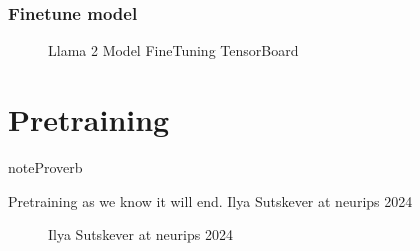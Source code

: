 \documentclass[letterpaper,11pt,english]{sphinxmanual}
\begin{document}
\subsection{Fine\sphinxhyphen{}tune model}
\label{\detokenize{finetuning:fine-tune-model}}
\begin{sphinxVerbatim}[commandchars=\\\{\}]
  


\end{sphinxVerbatim}

\begin{figure}[htbp]
\centering
\capstart

\noindent{}
\caption{Llama 2 Model Fine\sphinxhyphen{}Tuning TensorBoard}\label{\detokenize{finetuning:id7}}\label{\detokenize{finetuning:fig-fine-tuning-llm}}\end{figure}

\sphinxstepscope


\chapter{Pre\sphinxhyphen{}training}
\label{\detokenize{pretraining:pre-training}}\label{\detokenize{pretraining:pretraining}}\label{\detokenize{pretraining::doc}}
\begin{sphinxadmonition}{note}{Proverb}

\sphinxAtStartPar
Pre\sphinxhyphen{}training as we know it will end. \textendash{} Ilya Sutskever at neurips 2024

\begin{figure}[H]
\centering
\capstart

\noindent{}
\caption{Ilya Sutskever at neurips 2024}\label{\detokenize{pretraining:id3}}\label{\detokenize{pretraining:fig-ilya}}\end{figure}
\end{sphinxadmonition}
\end{document}
